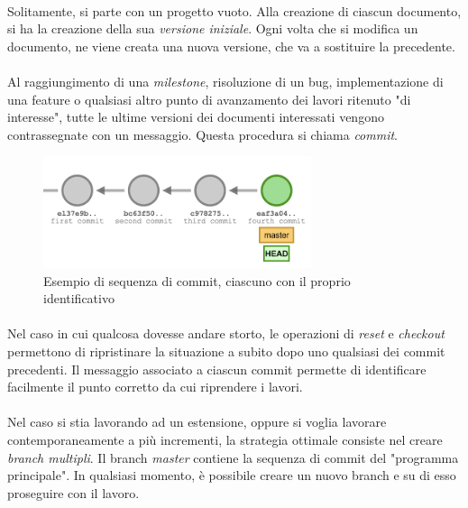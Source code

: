\documentclass[11pt,a4paper,english]{article}
\begin{document}
\paragraph{} Solitamente, si parte con un progetto vuoto. Alla creazione di ciascun documento, si ha la creazione della sua \emph{versione iniziale}. Ogni volta che si modifica un documento, ne viene creata una nuova versione, che va a sostituire la precedente. 

\paragraph{} Al raggiungimento di una \emph{milestone}, risoluzione di un bug, implementazione di una feature o qualsiasi altro punto di avanzamento dei lavori ritenuto "di interesse", tutte le ultime versioni dei documenti interessati vengono contrassegnate con un messaggio. Questa procedura si chiama \emph{commit}.

\begin{figure}[H]
    \centering
    \includegraphics[width=0.7\textwidth]{img/git-history.png}
    \caption{Esempio di sequenza di commit, ciascuno con il proprio identificativo}
\end{figure}

\paragraph{} Nel caso in cui qualcosa dovesse andare storto, le operazioni di \emph{reset} e \emph{checkout} permettono di ripristinare la situazione a subito dopo uno qualsiasi dei commit precedenti. Il messaggio associato a ciascun commit permette di identificare facilmente il punto corretto da cui riprendere i lavori. 

\paragraph{} Nel caso si stia lavorando ad un estensione, oppure si voglia lavorare contemporaneamente a più incrementi, la strategia ottimale consiste nel creare \emph{branch multipli}. Il branch \emph{master} contiene la sequenza di commit del "programma principale". In qualsiasi momento, è possibile creare un nuovo branch e su di esso proseguire con il lavoro. 
\end{document}
